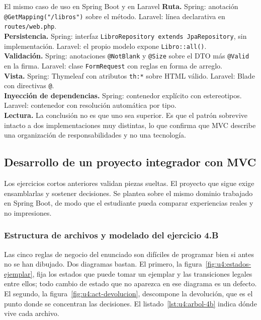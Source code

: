 \documentclass[11pt,a4paper,openany]{book}
\begin{document}
\begin{cajacompara}{El mismo caso de uso en Spring Boot y en Laravel}
	\textbf{Ruta.} Spring: anotación \texttt{@GetMapping("/libros")} sobre el método. Laravel: línea declarativa en \texttt{routes/web.php}.\\[3pt]
	\textbf{Persistencia.} Spring: interfaz \texttt{LibroRepository extends JpaRepository}, sin implementación. Laravel: el propio modelo expone \texttt{Libro::all()}.\\[3pt]
	\textbf{Validación.} Spring: anotaciones \texttt{@NotBlank} y \texttt{@Size} sobre el DTO más \texttt{@Valid} en la firma. Laravel: clase \texttt{FormRequest} con reglas en forma de arreglo.\\[3pt]
	\textbf{Vista.} Spring: Thymeleaf con atributos \texttt{th:*} sobre HTML válido. Laravel: Blade con directivas \texttt{@}.\\[3pt]
	\textbf{Inyección de dependencias.} Spring: contenedor explícito con estereotipos. Laravel: contenedor con resolución automática por tipo.\\[3pt]
	\textbf{Lectura.} La conclusión no es que uno sea superior. Es que el patrón sobrevive intacto a dos implementaciones muy distintas, lo que confirma que MVC describe una organización de responsabilidades y no una tecnología.
\end{cajacompara}

\subsection{Desarrollo de un proyecto integrador con MVC}
\label{sec:u4:integrador-mvc}

Los ejercicios cortos anteriores validan piezas sueltas. El proyecto que sigue exige ensamblarlas y sostener decisiones. Se plantea sobre el mismo dominio trabajado en Spring Boot, de modo que el estudiante pueda comparar experiencias reales y no impresiones.


\subsubsection{Estructura de archivos y modelado del ejercicio 4.B}

Las cinco reglas de negocio del enunciado son difíciles de programar bien si antes no se han dibujado. Dos diagramas bastan. El primero, la figura~\ref{fig:u4:estados-ejemplar}, fija los estados que puede tomar un ejemplar y las transiciones legales entre ellos; todo cambio de estado que no aparezca en ese diagrama es un defecto. El segundo, la figura~\ref{fig:u4:act-devolucion}, descompone la devolución, que es el punto donde se concentran las decisiones. El listado~\ref{lst:u4:arbol-4b} indica dónde vive cada archivo.
\end{document}
